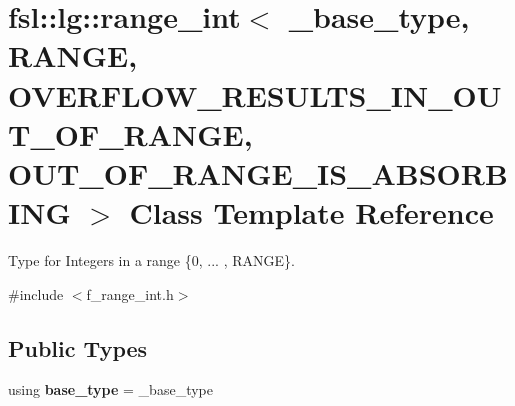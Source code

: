 \hypertarget{classfsl_1_1lg_1_1range__int}{}\section{fsl\+::lg\+::range\+\_\+int$<$ \+\_\+base\+\_\+type, R\+A\+N\+GE, O\+V\+E\+R\+F\+L\+O\+W\+\_\+\+R\+E\+S\+U\+L\+T\+S\+\_\+\+I\+N\+\_\+\+O\+U\+T\+\_\+\+O\+F\+\_\+\+R\+A\+N\+GE, O\+U\+T\+\_\+\+O\+F\+\_\+\+R\+A\+N\+G\+E\+\_\+\+I\+S\+\_\+\+A\+B\+S\+O\+R\+B\+I\+NG $>$ Class Template Reference}
\label{classfsl_1_1lg_1_1range__int}


Type for Integers in a range \{0, ... , R\+A\+N\+GE\}.  




{\ttfamily \#include $<$f\+\_\+range\+\_\+int.\+h$>$}

\subsection*{Public Types}
\begin{DoxyCompactItemize}
\item 
\mbox{\label{classfsl_1_1lg_1_1range__int_a901feb77897b3353d554f06d4d6a8f4a}} 
using {\bfseries base\+\_\+type} = \+\_\+base\+\_\+type
\end{DoxyCompactItemize}
